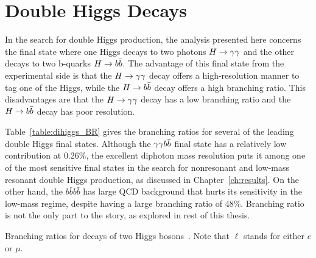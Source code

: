 

\section{Double Higgs Decays}

In the search for double Higgs production, the analysis presented here concerns the final state
where one Higgs decays to two photons $H\to\gamma\gamma$ and the other decays to two b-quarks $H\to b\bar{b}$.
The advantage of this final state from the experimental side is that the $H\to\gamma\gamma$ decay
offers a high-resolution manner to tag one of the Higgs, while the $H\to b\bar{b}$ decay offers a high branching
ratio. This disadvantages are that the $H\to\gamma\gamma$ decay has a low branching ratio and the
$H\to b\bar{b}$ decay has poor resolution.

Table~\ref{table:dihiggs_BR} gives the branching ratios for several of the leading double Higgs
final states. Although the $\gamma\gamma b\bar{b}$ final state has a relatively low contribution at 0.26\%,
the excellent
diphoton mass resolution puts it among one of the most sensitive final states in the search for
nonresonant and low-mass resonant double Higgs production, as discussed in Chapter~\ref{ch:results}.
On the other hand, the $b\bar{b} b\bar{b}$ has large QCD background that hurts its sensitivity
in the low-mass regime, despite having a large branching ratio of 48\%. Branching ratio is not the
only part to the story, as explored in rest of this thesis.

\begin{table}[ht]
  \centering
  \renewcommand{\arraystretch}{1.4}
  \caption{Branching ratios for decays of two Higgs bosons~\cite{LHC:SMHiggsBR}.
Note that $\ell$ stands for either $e$ or $\mu$.}
  
  \label{table:dihiggs_BR}
\end{table}


